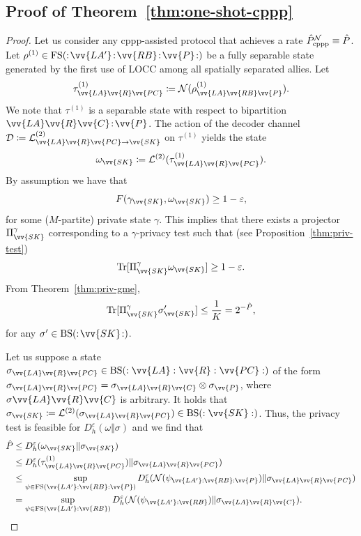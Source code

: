 \documentclass[aps,pra,twocolumn,superscriptaddress,longbibliography]{revtex4-1}
\def\Tr{\operatorname{Tr}}
\def\FS{\operatorname{FS}}
\def\BS{\operatorname{BS}}
\newcommand{\mc}[1]{\mathcal{#1}}
\begin{document}
\begin{appendix}
\subsection{Proof of Theorem~\ref{thm:one-shot-cppp}}\label{app:one-shot-cppp}
\begin{proof}
Let us consider any cppp-assisted protocol that achieves a rate $\hat{P}_{\textnormal{cppp}}^{\mc{N}}\equiv \hat{P}$. Let $\rho^{(1)}\in\FS(:\!\vv{LA'}\!:\!\vv{RB}\!:\!\vv{P}\!:)$ be a fully separable state generated by the first use of LOCC among all spatially separated allies. Let 
\begin{equation}
\tau^{(1)}_{\vv{LA}\vv{R}\vv{PC}}\coloneqq \mc{N}(\rho^{(1)}_{\vv{LA}\vv{RB}\vv{P}}).
\end{equation}  
We note that $\tau^{(1)}$ is a separable state with respect to bipartition $\vv{LA}\vv{R}\vv{C}\!:\!\vv{P}$. The action of the decoder channel $\mc{D}\coloneqq \mc{L}^{(2)}_{\vv{LA}\vv{R}\vv{PC}\to \vv{SK}}$ on $\tau^{(1)}$ yields the state
\begin{equation}
\omega_{\vv{SK}}\coloneqq \mc{L}^{(2)}(\tau^{(1)}_{\vv{LA}\vv{R}\vv{PC}}).
\end{equation}
By assumption we have that
\begin{equation}
F(\gamma_{\vv{SK}}, \omega_{\vv{SK}})\geq 1-\varepsilon,
\end{equation}
for some ($M$-partite) private state $\gamma$. This implies that there exists a projector $\Pi^\gamma_{\vv{SK}}$ corresponding to a $\gamma$-privacy test such that (see Proposition~\ref{thm:priv-test})
\begin{equation}
\Tr[\Pi^\gamma_{\vv{SK}}\omega_{\vv{SK}}]\geq 1-\varepsilon. 
\end{equation}
From Theorem~\ref{thm:priv-gme},
\begin{equation}
\Tr[\Pi^\gamma_{\vv{SK}}\sigma'_{\vv{SK}}]\leq \frac{1}{K}=2^{-\hat{P}},
\end{equation}
for any $\sigma'\in\BS(:\!\vv{SK}\!:)$. 

Let us suppose a state $\sigma_{\vv{LA}\vv{R}\vv{PC}}\in\BS(:\vv{LA}:\vv{R}:\vv{PC}:)$ of the form $\sigma_{\vv{LA}\vv{R}\vv{PC}}=\sigma_{\vv{LA}\vv{R}\vv{C}}\otimes\sigma_{\vv{P}}$, where $\sigma{\vv{LA}\vv{R}\vv{C}}$ is arbitrary. It holds that $\sigma_{\vv{SK}}\coloneqq \mc{L}^{(2)}(\sigma_{\vv{LA}\vv{R}\vv{PC}})\in\BS(:\vv{SK}:)$. Thus, the privacy test is feasible for $D^\varepsilon_h(\omega\Vert \sigma)$ and we find that
\begin{align}
\hat{P} &\leq D^\varepsilon_h(\omega_{\vv{SK}}\Vert \sigma_{\vv{SK}})\\
&\leq  D^\varepsilon_h(\tau^{(1)}_{\vv{LA}\vv{R}\vv{PC}})\Vert \sigma_{\vv{LA}\vv{R}\vv{PC}} )\label{eq:40}\\
&\leq \sup_{\psi\in\FS(\vv{LA'}:\vv{RB}:\vv{P})}D^\varepsilon_h(\mc{N}(\psi_{\vv{LA'}:\vv{RB}:\vv{P}})\Vert \sigma_{\vv{LA}\vv{R}\vv{PC}})\\
&= \sup_{\psi\in\FS(\vv{LA'}:\vv{RB})}D^\varepsilon_h(\mc{N}(\psi_{\vv{LA'}:\vv{RB}})\Vert \sigma_{\vv{LA}\vv{R}\vv{C}}).\label{eq:one-shot-proof-part}
\end{align}


\end{proof}
\end{appendix}
\end{document}
